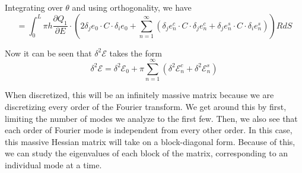 \documentclass[11pt]{article}
\theoremstyle{plain}
\theoremstyle{definition}
\begin{document}
Integrating over $\theta$ and using orthogonality, we have
\[
= \int_0^L \pi h \dfrac{\partial Q_1}{\partial E} \cdot \left( 2 \delta_j e_0 \cdot C \cdot \delta_i e_0 + \sum_{n=1}^\infty \left( \delta_j e_n^c \cdot C \cdot \delta_j e_n^c + \delta_j e_n^s \cdot C \cdot \delta_i e_n^s \right) \right) R dS
\]

Now it can be seen that $\delta^2 \mathcal{E} $ takes the form
\[
\delta^2 \mathcal{E} = \delta^2 \mathcal{E}_0 + \pi \sum_{n = 1}^\infty\left( \delta^2 \mathcal{E}_n^c + \delta^2 \mathcal{E}_n^s \right)
\]

When discretized, this will be an infinitely massive matrix because we are discretizing every order of the Fourier transform. We get around this by first, limiting the number of modes we analyze to the first few. Then, we also see that each order of Fourier mode is independent from every other order. In this case, this massive Hessian matrix will take on a block-diagonal form. Because of this, we can study the eigenvalues of each block of the matrix, corresponding to an individual mode at a time.
\end{document}
